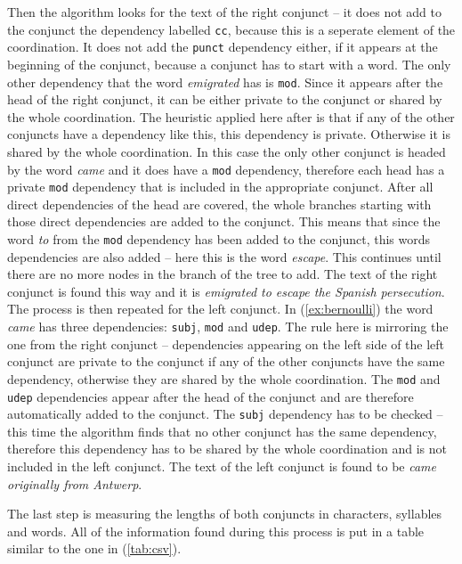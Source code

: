 Then the algorithm looks for the text of the right conjunct -- it does not add to the conjunct the dependency labelled \texttt{cc}, because this is a seperate element of the coordination. It does not add the \texttt{punct} dependency either, if it appears at the beginning of the conjunct, because a conjunct has to start with a word. The only other dependency that the word \textsl{emigrated} has is \texttt{mod}. Since it appears after the head of the right conjunct, it can be either private to the conjunct or shared by the whole coordination. The heuristic applied here after \cite{pbg2023} is that if any of the other conjuncts have a dependency like this, this dependency is private. Otherwise it is shared by the whole coordination. In this case the only other conjunct is headed by the word \textsl{came} and it does have a \texttt{mod} dependency, therefore each head has a private \texttt{mod} dependency that is included in the appropriate conjunct. After all direct dependencies of the head are covered, the whole branches starting with those direct dependencies are added to the conjunct. This means that since the word \textsl{to} from the \texttt{mod} dependency has been added to the conjunct, this words dependencies are also added -- here this is the word \textsl{escape}. This continues until there are no more nodes in the branch of the tree to add. The text of the right conjunct is found this way and it is \textsl{emigrated to escape the Spanish persecution}. The process is then repeated for the left conjunct. In (\ref{ex:bernoulli}) the word \textsl{came} has three dependencies: \texttt{subj}, \texttt{mod} and \texttt{udep}. The rule here is mirroring the one from the right conjunct -- dependencies appearing on the left side of the left conjunct are private to the conjunct if any of the other conjuncts have the same dependency, otherwise they are shared by the whole coordination. The \texttt{mod} and \texttt{udep} dependencies appear after the head of the conjunct and are therefore automatically added to the conjunct. The \texttt{subj} dependency has to be checked -- this time the algorithm finds that no other conjunct has the same dependency, therefore this dependency has to be shared by the whole coordination and is not included in the left conjunct. The text of the left conjunct is found to be \textsl{came originally from Antwerp}. 

The last step is measuring the lengths of both conjuncts in characters, syllables and words. All of the information found during this process is put in a table similar to the one in (\ref{tab:csv}).

